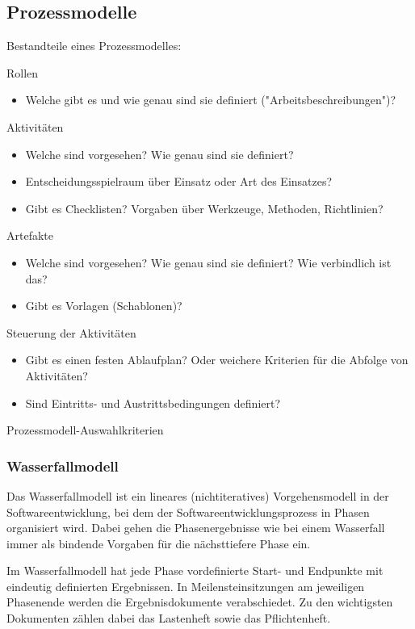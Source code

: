\subsection{Prozessmodelle}

Bestandteile eines Prozessmodelles:

Rollen
\begin{itemize}
\item Welche gibt es und wie genau sind sie definiert ("Arbeitsbeschreibungen")?
\end{itemize}

Aktivitäten
\begin{itemize}
\item Welche sind vorgesehen? Wie genau sind sie definiert?
\item Entscheidungsspielraum über Einsatz oder Art des Einsatzes?
\item Gibt es Checklisten? Vorgaben über Werkzeuge, Methoden, Richtlinien?
\end{itemize}

Artefakte
\begin{itemize}
\item Welche sind vorgesehen? Wie genau sind sie definiert? Wie verbindlich ist das?
\item Gibt es Vorlagen (Schablonen)?
\end{itemize}

Steuerung der Aktivitäten
\begin{itemize}
\item Gibt es einen festen Ablaufplan? Oder weichere Kriterien für die Abfolge von Aktivitäten?
\item Sind Eintritts- und Austrittsbedingungen definiert?
\end{itemize}

Prozessmodell-Auswahlkriterien

\subsubsection{Wasserfallmodell}

Das Wasserfallmodell ist ein lineares (nichtiteratives) Vorgehensmodell in der Softwareentwicklung, bei dem der Softwareentwicklungsprozess in Phasen organisiert wird.
Dabei gehen die Phasenergebnisse wie bei einem Wasserfall immer als bindende Vorgaben für die nächsttiefere Phase ein.

Im Wasserfallmodell hat jede Phase vordefinierte Start- und Endpunkte mit eindeutig definierten Ergebnissen.
In Meilensteinsitzungen am jeweiligen Phasenende werden die Ergebnisdokumente verabschiedet.
Zu den wichtigsten Dokumenten zählen dabei das Lastenheft sowie das Pflichtenheft.

